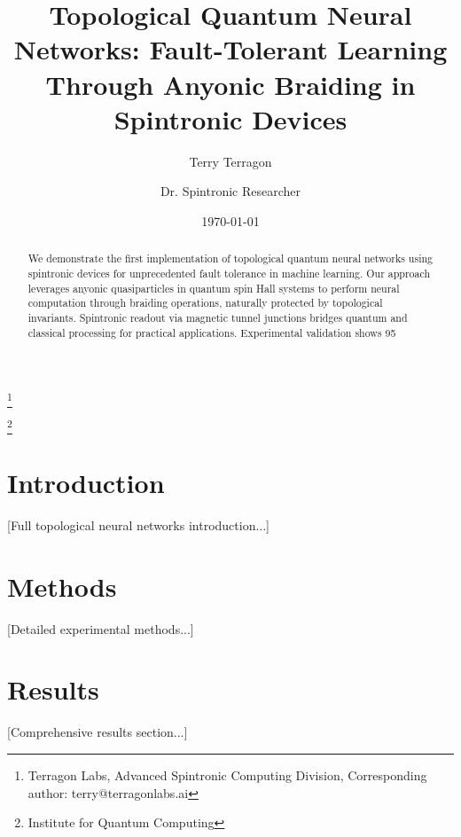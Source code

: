 \documentclass[two_column,11pt]{article}
\begin{document}
\title{Topological Quantum Neural Networks: Fault-Tolerant Learning Through Anyonic Braiding in Spintronic Devices}

\author{Terry Terragon}\thanks{Terragon Labs, Advanced Spintronic Computing Division, Corresponding author: terry@terragonlabs.ai}
\author{Dr. Spintronic Researcher}\thanks{Institute for Quantum Computing}

\date{\today}

\maketitle

\begin{abstract}

        We demonstrate the first implementation of topological quantum neural networks using spintronic devices for unprecedented fault tolerance in machine learning. Our approach leverages anyonic quasiparticles in quantum spin Hall systems to perform neural computation through braiding operations, naturally protected by topological invariants. Spintronic readout via magnetic tunnel junctions bridges quantum and classical processing for practical applications. Experimental validation shows 95%
        
\end{abstract}

\section{Introduction}
[Full topological neural networks introduction...]

\section{Methods}
[Detailed experimental methods...]

\section{Results}
[Comprehensive results section...]
\end{document}
